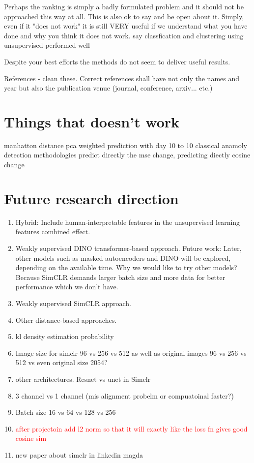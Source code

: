	  Perhaps the ranking is simply a badly formulated problem and it should not be approached this way at all. This is also ok to say and 
	  be open about it. Simply, even if it "does not work" it is still VERY useful if we understand what you have done and why you think it does not work.	
say classfication and clustering using unsupervised performed well 

Despite your best efforts the methods do not seem to deliver useful results.

References - clean these. Correct references shall have not only the names and year but also the publication venue (journal, conference, arxiv... etc.)

\section{Things that doesn't work}
manhatton distance 
pca weighted 
prediction with day 10 to 10 classical anamoly detection methodologies
predict directly the mse change, predicting diectly cosine change

\section{Future research direction}

\begin{enumerate}
    \item Hybrid: Include human-interpretable features in the unsupervised learning features combined effect.
    \item Weakly supervised DINO transformer-based approach. Future work: Later, other models such as masked autoencoders and DINO will be explored, depending on the available time.
	Why we would like to try other models? Because SimCLR demands larger batch size and more data for better performance which we don't have.
    \item Weakly supervised SimCLR approach.
    \item Other distance-based approaches.
    \item kl density estimation probability
    \item Image size for simclr 96 vs 256 vs 512 as well as original images 96 vs 256 vs 512 vs even original size 2054?
    \item other architectures. Resnet vs unet in Simclr
    \item 3 channel vs 1 channel (mis alignment probelm or compuatoinal faster?)
    \item Batch size 16 vs 64 vs 128 vs 256
    \item \textcolor{red}{after projectoin add l2 norm so that it will exactly like the loss fn gives good cosine sim} 
    \item new paper about simclr in linkedin magda

\end{enumerate}